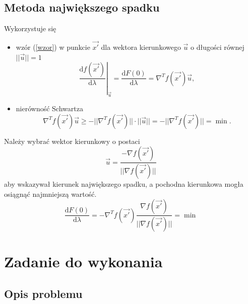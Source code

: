 \subsection{Metoda największego spadku}
Wykorzystuje się\begin{itemize}
	\item wzór (\ref{wzor}) w punkcie $\vec{x'}$ dla wektora kierunkowego $\vec{u}$ o długości równej $||\vec{u}|| = 1$
	\begin{equation}
	\left.\frac{\text{d}f(\vec{x'})}{\text{d}\lambda}\right|_{\vec{u}} = \frac{\text{d}F(0)}{\text{d}\lambda} = 
	\nabla ^{T} f(\vec{x'})\vec{u},
	\end{equation}
	\item nierówność Schwartza \begin{equation}
	\nabla^{T} f(\vec{x'}) \vec{u} \geq - ||\nabla^{T} f(\vec{x'})|| \cdot || \vec{u}  || = 
	- || \nabla ^{T} f(\vec{x'})|| = \min.
	\end{equation}
\end{itemize} 
Należy wybrać wektor kierunkowy o postaci
\begin{equation}
\vec{u} = \frac{- \nabla f(\vec{x'})}{||\nabla f(\vec{x'})||}
\end{equation}
aby wskazywał kierunek największego spadku, a pochodna kierunkowa mogła osiągnąć najmniejszą wartość.
\begin{equation}
\frac{\text{d} F(0) }{\text{d} \lambda} = - \nabla^T f(\vec{x'})  \frac{\nabla f(\vec{x'})}{||\nabla f(\vec{x'})||} = \min
\end{equation}

\newpage
\section{Zadanie do wykonania}

\subsection{Opis problemu}

